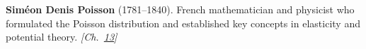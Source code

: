 \textbf{Siméon Denis Poisson} (1781–1840). French mathematician and physicist who formulated the Poisson distribution and established key concepts in elasticity and potential theory. \emph{[Ch.~\hyperref[ch:poissonsspot]{13}]}

